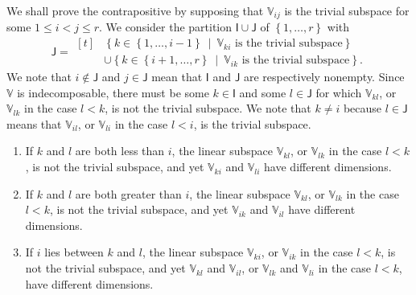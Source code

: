 \documentclass[oneside]{amsart}
\theoremstyle{plain}
\theoremstyle{definition}
\theoremstyle{remark}
\numberwithin{equation}{section}
\begin{document}
We shall prove the contrapositive by supposing that $\mathbb{V}_{ij}$ is
the trivial subspace for some $1 \leq i < j \leq r$. We consider the
partition $\mathsf{I} \cup \mathsf{J}$ of $\left\{1, \dotsc, r\right\}$
with
\[
\mathsf{J} =
\begin{aligned}[t]
&\left\{k \in \left\{1, \dotsc, i-1\right\}\ \middle|\ \mathbb{V}_{ki}
\text{ is the trivial subspace}\right\}
\\
&\cup \left\{k \in \left\{i+1, \dotsc, r\right\}\ \middle|\ \mathbb{V}_{ik}
\text{ is the trivial subspace}\right\}.
\end{aligned}
\]
We note that $i \notin \mathsf{J}$ and $j \in \mathsf{J}$ mean that
$\mathsf{I}$ and $\mathsf{J}$ are respectively nonempty. Since $\mathbb{V}$
is indecomposable, there must be some $k \in \mathsf{I}$ and some $l \in
\mathsf{J}$ for which $\mathbb{V}_{kl}$, or $\mathbb{V}_{lk}$ in the case
$l < k$, is not the trivial subspace. We note that $k \neq i$ because $l
\in \mathsf{J}$ means that $\mathbb{V}_{il}$, or $\mathbb{V}_{li}$ in the
case $l < i$, is the trivial subspace.
\begin{enumerate}[label=(\roman*)]
\item If $k$ and $l$ are both less than $i$, the linear subspace
$\mathbb{V}_{kl}$, or $\mathbb{V}_{lk}$ in the case $l < k$, is not the
trivial subspace, and yet $\mathbb{V}_{ki}$ and $\mathbb{V}_{li}$ have
different dimensions.

\item If $k$ and $l$ are both greater than $i$, the linear subspace
$\mathbb{V}_{kl}$, or $\mathbb{V}_{lk}$ in the case $l < k$, is not the
trivial subspace, and yet $\mathbb{V}_{ik}$ and $\mathbb{V}_{il}$ have
different dimensions.

\item If $i$ lies between $k$ and $l$, the linear subspace
$\mathbb{V}_{ki}$, or $\mathbb{V}_{ik}$ in the case $l < k$, is not the
trivial subspace, and yet $\mathbb{V}_{kl}$ and $\mathbb{V}_{il}$, or
$\mathbb{V}_{lk}$ and $\mathbb{V}_{li}$ in the case $l < k$, have different
dimensions.

\end{enumerate}
\end{document}
